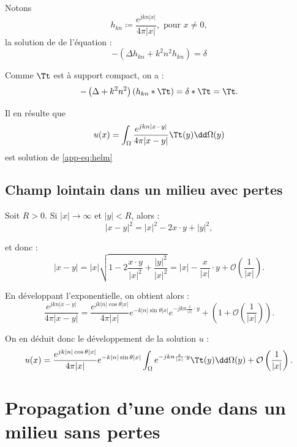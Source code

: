 Notons 
\begin{equation}
    h_{kn} \coloneq \frac{e^{jkn|x|}}{4\pi|x|},\text{ pour } x\neq0,
\end{equation}
 la solution de de l'équation :
 \begin{equation}
    -\left(\Delta h_{kn}+k^2n^2h_{kn}\right) = \delta
 \end{equation}

Comme $\Tt$ est à support compact, on a : 
\begin{equation}
     -\left(\Delta +k^2n^2\right)\left(h_{kn}\ast\Tt\right) = \delta\ast\Tt = \Tt.
\end{equation}

Il en résulte que 
\begin{equation}
    u(x) = \int_{\Omega} \frac{e^{jkn|x-y|}}{4\pi|x-y|}\Tt(y)\dd \Omega(y)
\end{equation}
est solution de \eqref{app-eq:helm}

\subsection{Champ lointain dans un milieu avec pertes}

Soit $R > 0$. Si $|x|\to\infty$ et $|y|<R$, alors :
\begin{equation}
    |x-y|^2 = |x|^2 - 2 x\cdot y + |y|^2,
\end{equation}

et donc : 
\begin{equation}
    |x-y| = |x|\sqrt{1-2\frac{x\cdot y}{|x|^2}+\frac{|y|^2}{|x|^2}} = |x| - \frac{x}{|x|}\cdot y + \mathcal O\left(\frac1{|x|}\right).
\end{equation}

En développant l'exponentielle, on obtient alors :
\begin{equation}
    \frac{e^{jkn|x-y|}}{4\pi|x-y|} = \frac{e^{jk|n|\cos\theta|x|}}{4\pi|x|}e^{-k|n|\sin\theta|x|}e^{-jkn\frac{x}{|x|}\cdot y} + \left(1+\mathcal O\left(\frac1{|x|}\right)\right).
\end{equation}

On en déduit donc le développement de la solution $u$ :
\begin{equation}
    u(x) = \frac{e^{jk|n|\cos\theta|x|}}{4\pi|x|}e^{-k|n|\sin\theta|x|}\int_{\Omega} e^{-jkn\frac{x}{|x|}\cdot y}\Tt(y)\dd\Omega(y) + \mathcal O\left(\frac1{|x|}\right).
    \label{app-eq:taylor-pertes}
\end{equation}

\section{Propagation d'une onde dans un milieu sans pertes}
